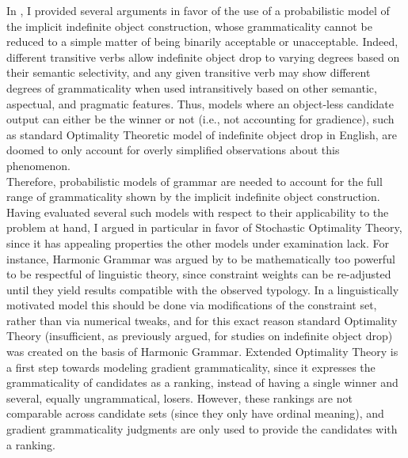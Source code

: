 In , I provided several arguments in favor of the use of a probabilistic model of the implicit indefinite object construction, whose grammaticality cannot be reduced to a simple matter of being binarily acceptable or unacceptable. Indeed, different transitive verbs allow indefinite object drop to varying degrees based on their semantic selectivity, and any given transitive verb may show different degrees of grammaticality when used intransitively based on other semantic, aspectual, and pragmatic features. Thus, models where an object-less candidate output can either be the winner or not (i.e., not accounting for gradience), such as  standard Optimality Theoretic model of indefinite object drop in English, are doomed to only account for overly simplified observations about this phenomenon.\\
Therefore, probabilistic models of grammar are needed to account for the full range of grammaticality shown by the implicit indefinite object construction. Having evaluated several such models with respect to their applicability to the problem at hand, I argued in particular in favor of Stochastic Optimality Theory, since it has appealing properties the other models under examination lack. For instance, Harmonic Grammar was argued by \textcite{kuhn2002corpus} to be mathematically too powerful to be respectful of linguistic theory, since constraint weights can be re-adjusted until they yield results compatible with the observed typology. In a linguistically motivated model this should be done via modifications of the constraint set, rather than via numerical tweaks, and for this exact reason standard Optimality Theory (insufficient, as previously argued, for studies on indefinite object drop) was created on the basis of Harmonic Grammar.  Extended Optimality Theory is a first step towards modeling gradient grammaticality, since it expresses the grammaticality of candidates as a ranking, instead of having a single winner and several, equally ungrammatical, losers. However, these rankings are not comparable across candidate sets (since they only have ordinal meaning), and gradient grammaticality judgments are only used to provide the candidates with a ranking.\\
